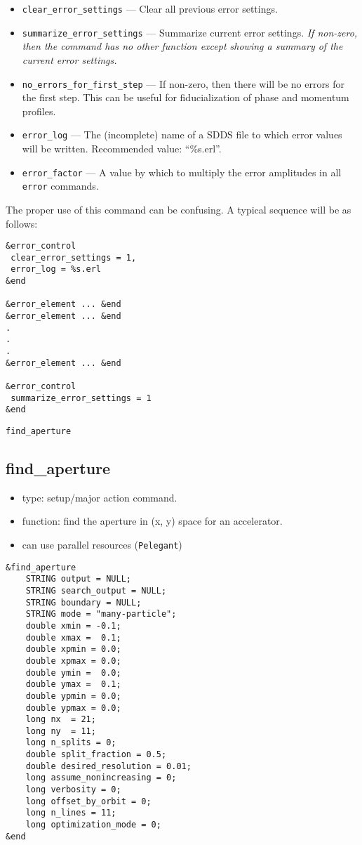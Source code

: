 \documentclass[11pt]{article}
\begin{document}
\begin{itemize}
\item \verb|clear_error_settings| --- Clear all previous error settings.
\item \verb|summarize_error_settings| --- Summarize current error settings.  {\em If non-zero, then the command has no other function  except
    showing a summary of the current error settings.}
\item \verb|no_errors_for_first_step| --- If non-zero, then there will be no errors for the first step.  This can be useful for
 fiducialization of phase and momentum profiles.
\item \verb|error_log| --- The (incomplete) name of a SDDS file to which error values will be written.  Recommended value: ``\%s.erl''.
\item \verb|error_factor| --- A value by which to multiply the error amplitudes in all \verb|error| commands.
\end{itemize}

The proper use of this command can be confusing.  A typical sequence will be as follows:
\begin{verbatim}
&error_control
 clear_error_settings = 1,
 error_log = %s.erl
&end

&error_element ... &end
&error_element ... &end
.
.
.
&error_element ... &end

&error_control
 summarize_error_settings = 1
&end
\end{verbatim}

\newpage
\begin{center}{\Large\verb|find_aperture|}\end{center}
\subsection{find\_aperture \label{subsec:findaperture}}

\begin{itemize}
\item type: setup/major action command.
\item function: find the aperture in (x, y) space for an accelerator.
\item can use parallel resources (\verb|Pelegant|)
\end{itemize}

\begin{verbatim}
&find_aperture
    STRING output = NULL;
    STRING search_output = NULL;
    STRING boundary = NULL;
    STRING mode = "many-particle";
    double xmin = -0.1;
    double xmax =  0.1;
    double xpmin = 0.0;
    double xpmax = 0.0;
    double ymin =  0.0;
    double ymax =  0.1;
    double ypmin = 0.0;
    double ypmax = 0.0;
    long nx  = 21;
    long ny  = 11;
    long n_splits = 0;
    double split_fraction = 0.5;
    double desired_resolution = 0.01;
    long assume_nonincreasing = 0;
    long verbosity = 0;    
    long offset_by_orbit = 0;
    long n_lines = 11;
    long optimization_mode = 0;
&end
\end{verbatim}
\end{document}
